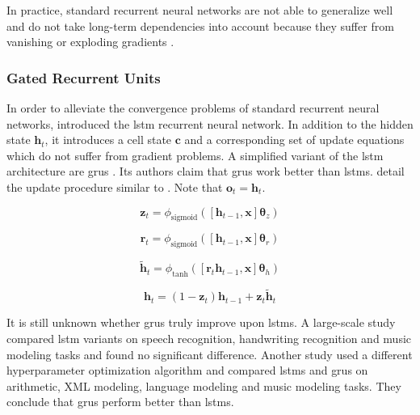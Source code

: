 In practice, standard recurrent neural networks are not able to generalize well and do not take long-term dependencies into account because they suffer from vanishing or exploding gradients \citep{hochreiterdipl,Bengio:1994:LLD:2325857.2328340}.

\subsubsection{Gated Recurrent Units}

In order to alleviate the convergence problems of standard recurrent neural networks, \citet{Hochreiter:1997:LSM:1246443.1246450} introduced the \gls{lstm} recurrent neural network. In addition to the hidden state $\mathbf{h}_t$, it introduces a cell state $\mathbf{c}$ and a corresponding set of update equations which do not suffer from gradient problems. A simplified variant of the \gls{lstm} architecture are \glspl{gru} \citep{cho14}. Its authors claim that \glspl{gru} work better than \glspl{lstm}.  detail the update procedure similar to . Note that $\mathbf{o}_t = \mathbf{h}_t$.

\begin{equation}
\label{eq:gru1}
        \mathbf{z}_t = \phi_\text{sigmoid}([\mathbf{h}_{t-1},\mathbf{x}]\boldsymbol{\theta}_z)
\end{equation}

\begin{equation}
\mathbf{r}_t = \phi_\text{sigmoid}([\mathbf{h}_{t-1},\mathbf{x}]\boldsymbol{\theta}_r)
\end{equation}

\begin{equation}
\mathbf{\tilde{h}}_t = \phi_\text{tanh}([\mathbf{r}_t \mathbf{h}_{t-1},\mathbf{x}]\boldsymbol{\theta}_h)
\end{equation}

\begin{equation}
\label{eq:gru4}
\mathbf{h}_t = (1 - \mathbf{z}_t) \mathbf{h}_{t-1} + \mathbf{z}_t \mathbf{\tilde{h}}_t
\end{equation}

It is still unknown whether \glspl{gru} truly improve upon \glspl{lstm}. A large-scale study \citep{7508408} compared \gls{lstm} variants on speech recognition, handwriting recognition and music modeling tasks and found no significant difference. Another study \citep{pmlr-v37-jozefowicz15} used a different hyperparameter optimization algorithm and compared \glspl{lstm} and \glspl{gru} on arithmetic, XML modeling, language modeling and music modeling tasks. They conclude that \glspl{gru} perform better than \glspl{lstm}.


